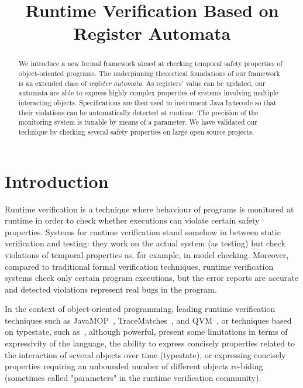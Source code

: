 \documentclass[9pt, preprint]{sigplanconf} %
\title{Runtime Verification Based on Register Automata}
\theoremstyle{definition}
\theoremstyle{remark}
\begin{document}
\maketitle
\begin{abstract} %
We introduce a new formal framework aimed at checking temporal safety properties of object-oriented programs.
The underpinning theoretical foundations of our framework is an extended class of {\em register automata}.
As registers' value can be updated, our automata are able to express highly complex properties of systems involving multiple interacting objects.
Specifications are then used to instrument Java bytecode so that their violations can be automatically detected at runtime.
The precision of the monitoring system is tunable by means of a parameter.
We have validated our technique by checking several safety properties on large open source projects.

\end{abstract}

\section{Introduction} %

Runtime verification is a technique where behaviour of programs is monitored at runtime in order to check whether executions
can violate certain safety properties.
Systems for runtime verification stand somehow in between static verification and testing: they work on the actual system (as testing) but check violations of temporal properties as, for example, in model checking. Moreover, compared to traditional formal verification techniques, runtime verification systems check only certain program executions, but the error reports are accurate and detected violations represent real bugs in the program.

In the context of object-oriented programming,  leading runtime verification techniques such as JavaMOP~\cite{}, 
TraceMatches~\cite{}, and QVM~\cite{}, or techniques based on typestate, such as~\cite{xxxxx}, although powerful,  present some limitations in  
terms of expressivity of the language, the ability to express concisely properties related to the interaction of several objects 
over time (typestate),  or expressing concisely properties requiring an unbounded number of different objects re-biding (sometimes called "parameters" in the runtime verification community).

\end{document}
